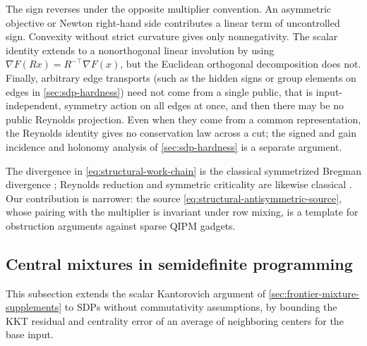 \begin{remark}
\label{rem:structural-work-scope}
The sign reverses under the opposite multiplier convention.  An asymmetric
objective or Newton right-hand side contributes a linear term of
uncontrolled sign.  Convexity without strict curvature gives only
nonnegativity.  The scalar identity extends to a nonorthogonal linear
involution by using $\nabla F(Rx)=R^{-\top}\nabla F(x)$, but the Euclidean
orthogonal decomposition does not.  Finally, arbitrary edge transports (such as the hidden signs or group
elements on edges in \cref{sec:sdp-hardness}) need not come from a single
public, that is input-independent, symmetry action on all edges at once, and
then there may be no public Reynolds projection.  Even when
they come from a common representation, the Reynolds identity gives no
conservation law across a cut; the signed and gain incidence and holonomy
analysis of \cref{sec:sdp-hardness} is a separate argument.

The divergence in \eqref{eq:structural-work-chain} is the classical
symmetrized Bregman divergence
\cite{structural-bregman1967,structural-nielsen2009-bregman}; Reynolds
reduction and symmetric criticality are likewise classical
\cite{structural-palais1979-symmetric-criticality}.  Our contribution is
narrower: the source \eqref{eq:structural-antisymmetric-source}, whose
pairing with the multiplier is invariant under row mixing, is a template for
obstruction arguments against sparse QIPM gadgets.
\end{remark}

\subsection{Central mixtures in semidefinite programming}
\label{sec:structural-sdp-mixtures}

This subsection extends the scalar Kantorovich argument of
\cref{sec:frontier-mixture-supplements} to SDPs without commutativity
assumptions, by bounding the KKT residual and centrality error of an average
of neighboring centers for the base input.

